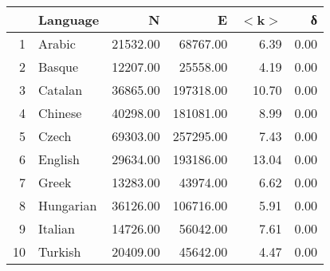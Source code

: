\begin{tabular}{rlrrrr}
  \hline
 & Language & N & E & $<$k$>$ & δ \\ 
  \hline
1 & Arabic & 21532.00 & 68767.00 & 6.39 & 0.00 \\ 
  2 & Basque & 12207.00 & 25558.00 & 4.19 & 0.00 \\ 
  3 & Catalan & 36865.00 & 197318.00 & 10.70 & 0.00 \\ 
  4 & Chinese & 40298.00 & 181081.00 & 8.99 & 0.00 \\ 
  5 & Czech & 69303.00 & 257295.00 & 7.43 & 0.00 \\ 
  6 & English & 29634.00 & 193186.00 & 13.04 & 0.00 \\ 
  7 & Greek & 13283.00 & 43974.00 & 6.62 & 0.00 \\ 
  8 & Hungarian & 36126.00 & 106716.00 & 5.91 & 0.00 \\ 
  9 & Italian & 14726.00 & 56042.00 & 7.61 & 0.00 \\ 
  10 & Turkish & 20409.00 & 45642.00 & 4.47 & 0.00 \\ 
   \hline
\end{tabular}
